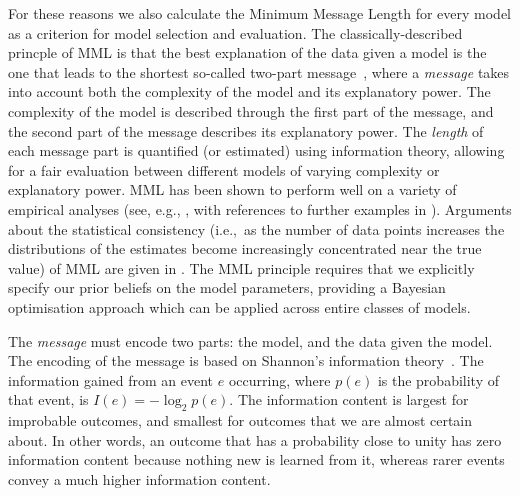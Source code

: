 \documentclass[twocolumn]{aastex62}
\begin{document}
For these reasons we also calculate the Minimum Message Length \citep[MML;][]{Wallace:2005}
for every model as a criterion for model selection and evaluation. 
The classically-described princple of MML is that the best explanation of the
data given a model is the one that leads to the shortest so-called two-part message~\citep{Wallace:2005}, 
where a \textit{message} takes into account both the complexity of the model 
and its explanatory power. The complexity of the model is described through
the first part of the message, and the second part of the message describes
its explanatory power. The \emph{length} of each message part is quantified
(or estimated) using information theory, allowing for a fair evaluation between
different models of varying complexity or explanatory power. MML has been 
shown to perform well on a variety of empirical analyses (see, e.g., 
\cite{viswanathan1999finding,fitzgibbon2004minimum}, with references to 
further examples in \cite{Wallace:2005,dowe2007bayes,Dowe2008a,Dowe2011a}).
Arguments about the statistical consistency (i.e.,~as the number of data 
points increases the distributions of the estimates become increasingly 
concentrated near the true value) of MML are given in \cite{DoweWallace1997a,Dowe2011a}.
The MML principle requires that we explicitly specify our prior beliefs on the
model parameters, providing a Bayesian optimisation approach which can be
applied across entire classes of models.

The \textit{message} must encode two parts: the model, and the data given the
model. The encoding of the message is based on Shannon's information theory~\citep{Shannon:1948}. 
The information gained from an event $e$ occurring, where $p(e)$ is the
probability of that event, is $I(e) = -\log_{2}{p(e)}$. The information content
is largest for improbable outcomes, and smallest for outcomes that we are 
almost certain about. In other words, an outcome that has a probability close
to unity has zero information content because nothing new is learned from it,
whereas rarer events convey a much higher information content. 
\end{document}
